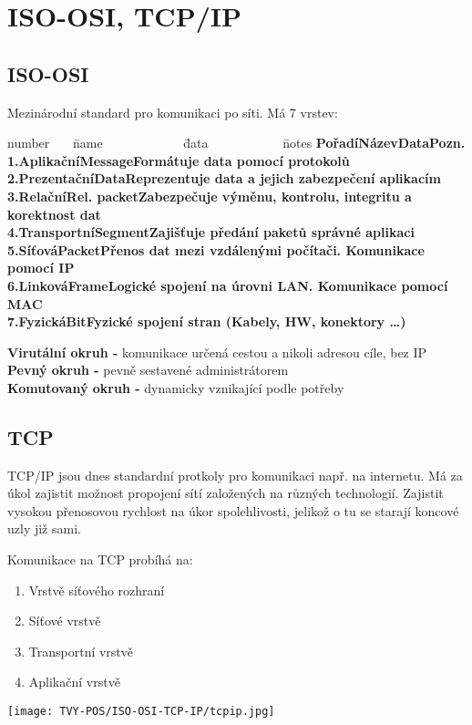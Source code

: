 \section{ISO-OSI, TCP/IP}
  \subsection{ISO-OSI}
    Mezinárodní standard pro komunikaci po síti. Má 7 vrstev:
    \begin{tabbing}
      number ~~~\= name ~~~~~~~~~~~~\= data ~~~~~~~~~~~\= notes \kill
      \bfseries Pořadí\>\bfseries Název\>\bfseries Data\>\bfseries Pozn.\\[2mm]
      1.\>Aplikační\>Message\>Formátuje data pomocí protokolů\\
      2.\>Prezentační\>Data\>Reprezentuje data a jejich zabezpečení aplikacím\\
      3.\>Relační\>Rel. packet\>Zabezpečuje výměnu, kontrolu, integritu a korektnost dat\\
      4.\>Transportní\>Segment\>Zajišťuje předání paketů správné aplikaci\\
      5.\>Síťová\>Packet\>Přenos dat mezi vzdálenými počítači. Komunikace pomocí IP\\
      6.\>Linková\>Frame\>Logické spojení na úrovni LAN. Komunikace pomocí MAC\\
      7.\>Fyzická\>Bit\>Fyzické spojení stran (Kabely, HW, konektory \dots)
    \end{tabbing}
    \textbf{Virutální okruh -} komunikace určená cestou a nikoli adresou cíle, bez IP \\
    \textbf{Pevný okruh -} pevně sestavené administrátorem \\
    \textbf{Komutovaný okruh -} dynamicky vznikající podle potřeby

  \subsection{TCP}
    TCP/IP jsou dnes standardní protkoly pro komunikaci např. na internetu.
    Má za úkol zajistit možnost propojení sítí založených na různých technologií.
    Zajistit vysokou přenosovou rychlost na úkor spolehlivosti, jelikož o tu se starají koncové uzly již sami.
    \begin{multicols}{2}
      Komunikace na TCP probíhá na:
      \begin{enumerate}
        \item Vrstvě síťového rozhraní
        \item Síťové vrstvě
        \item Transportní vrstvě
        \item Aplikační vrstvě
      \end{enumerate}
      \columnbreak
      \texttt{[image: TVY-POS/ISO-OSI-TCP-IP/tcpip.jpg]}
    \end{multicols}

